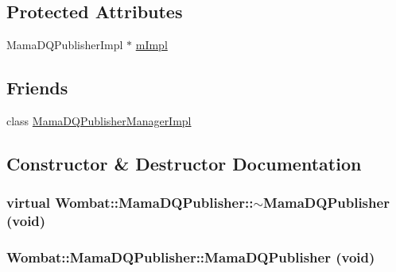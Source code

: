 \subsection*{Protected Attributes}
\begin{DoxyCompactItemize}
\item 
MamaDQPublisherImpl $\ast$ \hyperlink{classWombat_1_1MamaDQPublisher_a9856c401cd166cfc6c3e6ecc10a4812b}{mImpl}
\end{DoxyCompactItemize}
\subsection*{Friends}
\begin{DoxyCompactItemize}
\item 
class \hyperlink{classWombat_1_1MamaDQPublisher_aa6866d6aa7a5d87430a9fdb2663cb3b8}{MamaDQPublisherManagerImpl}
\end{DoxyCompactItemize}


\subsection{Constructor \& Destructor Documentation}
\hypertarget{classWombat_1_1MamaDQPublisher_ab62890fa9c9778e0a73dbb11a7d73af2}{
\subsubsection[{$\sim$MamaDQPublisher}]{\setlength{\rightskip}{0pt plus 5cm}virtual Wombat::MamaDQPublisher::$\sim$MamaDQPublisher (void)}}
\label{classWombat_1_1MamaDQPublisher_ab62890fa9c9778e0a73dbb11a7d73af2}
\hypertarget{classWombat_1_1MamaDQPublisher_a18044a1c4e48e1297f5e567a28fe2381}{
\subsubsection[{MamaDQPublisher}]{\setlength{\rightskip}{0pt plus 5cm}Wombat::MamaDQPublisher::MamaDQPublisher (void)}}
\label{classWombat_1_1MamaDQPublisher_a18044a1c4e48e1297f5e567a28fe2381}


